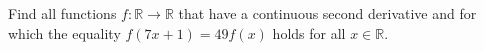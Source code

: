 Find all functions \(f \colon \mathbb{R} \to \mathbb{R}\) that have a continuous second derivative and for which the equality \(f(7x+1) = 49f(x)\) holds for all \(x \in \mathbb{R}\).
